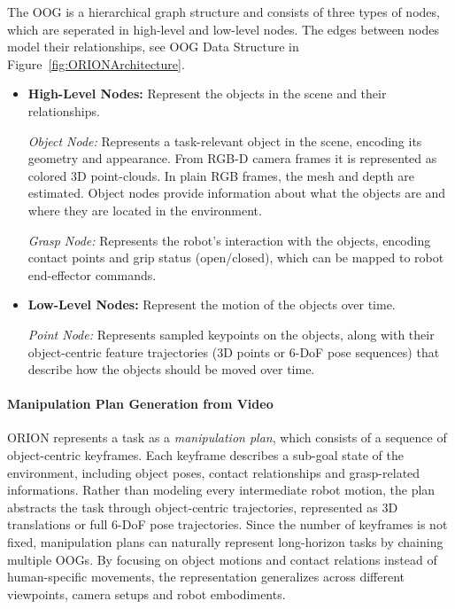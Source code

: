 The \ac{OOG} is a hierarchical graph structure and consists of three types of nodes, which are seperated in high-level and low-level nodes. The edges between nodes model their relationships, see \ac{OOG} Data Structure in Figure~\ref{fig:ORIONArchitecture}.
\begin{itemize}
    \item \textbf{High-Level Nodes:} Represent the objects in the scene and their relationships.
    
    \textit{Object Node:} Represents a task-relevant object in the scene, encoding its geometry and appearance. From RGB-D camera frames it is represented as colored 3D point-clouds. In plain RGB  frames, the mesh and depth are estimated. Object nodes provide information about what the objects are and where they are located in the environment.

    \textit{Grasp Node:} Represents the robot's interaction with the objects, encoding contact points and grip status (open/closed), which can be mapped to robot end-effector commands.

    \item \textbf{Low-Level Nodes:} Represent the motion of the objects over time.
    
    \textit{Point Node:} Represents sampled keypoints on the objects, along with their object-centric feature trajectories (3D points or 6-\acs{DoF} pose sequences) that describe how the objects should be moved over time.
\end{itemize}


\paragraph{Manipulation Plan Generation from Video}

ORION represents a task as a \textit{manipulation plan}, which consists of a sequence of object-centric keyframes. Each keyframe describes a sub-goal state of the environment, including object poses, contact relationships and grasp-related informations. Rather than modeling every intermediate robot motion, the plan abstracts the task through object-centric trajectories, represented as 3D translations or full 6-\acs{DoF} pose trajectories. Since the number of keyframes is not fixed, manipulation plans can naturally represent long-horizon tasks by chaining multiple \acp{OOG}. By focusing on object motions and contact relations instead of human-specific movements, the representation generalizes across different viewpoints, camera setups and robot embodiments.


